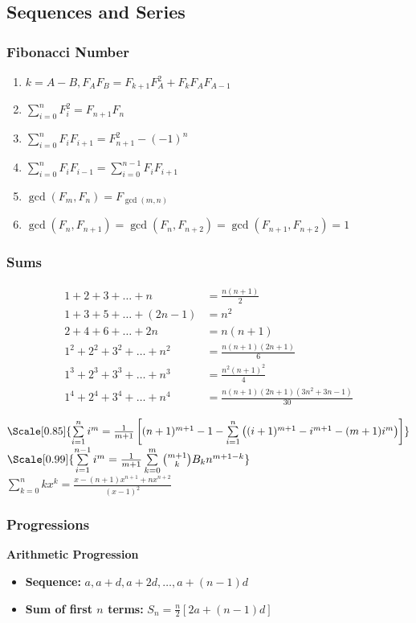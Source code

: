 \subsection{Sequences and Series}
\subsubsection{Fibonacci Number}
\begin{enumerate}
  \item $k=A-B, F_A F_B = F_{k+1} F_A^2 + F_k F_A F_{A-1}$
  \item $\sum_{i=0}^n F_i^2 = F_{n+1} F_n$
  \item $\sum_{i=0}^n F_i F_{i+1} = F_{n+1}^2 - (-1)^n$
  \item $\sum_{i=0}^n F_i F_{i-1} = \sum_{i=0}^{n-1} F_i F_{i+1}$
  \item $\operatorname{gcd}\left(F_m, F_n\right) = F_{\operatorname{gcd}(m, n)}$
  \item $\operatorname{gcd}\left(F_n, F_{n+1}\right) = \operatorname{gcd}\left(F_n, F_{n+2}\right) = \operatorname{gcd}\left(F_{n+1}, F_{n+2}\right) = 1$
\end{enumerate}

\subsubsection{Sums}
\begin{align*}
1 + 2 + 3 + \dots + n &= \frac{n(n+1)}{2} \\
1 + 3 + 5 + \dots + (2n-1) &= n^2 \\
2 + 4 + 6 + \dots + 2n &= n(n+1) \\
1^2 + 2^2 + 3^2 + \dots + n^2 &= \frac{n(n+1)(2n+1)}{6} \\
1^3 + 2^3 + 3^3 + \dots + n^3 &= \frac{n^2(n+1)^2}{4} \\
1^4 + 2^4 + 3^4 + \dots + n^4 &= \frac{n(n+1)(2n+1)(3n^2 + 3n - 1)}{30}
\end{align*}

$\Scale[0.85]{ \sum\limits_{i=1}^{n} i^{m} = \frac{1}{m + 1} \left[ (n + 1)^{m + 1} - 1 - \sum\limits_{i=1}^{n} \left((i+1)^{m+1} - i^{m+1} - (m + 1)i^{m}\right)\right] }$ \\
$\Scale[0.99]{\sum\limits_{i=1}^{n-1} i^{m} = \frac{1}{m + 1} \sum\limits_{k=0}^{m} \binom{m+1}{k} B_{k}n^{m + 1 - k}}$ \\
$\sum\limits_{k=0}^n kx^k = \frac{x - (n+1)x^{n+1} + nx^{n+2}}{(x-1)^2}$

\subsubsection{Progressions}
\textbf{Arithmetic Progression}
\begin{itemize}
\item \textbf{Sequence:} $a, a+d, a+2d, \dots, a+(n-1)d$
\item \textbf{Sum of first $n$ terms:} $S_n = \frac{n}{2} [2a + (n-1)d]$
\end{itemize}

